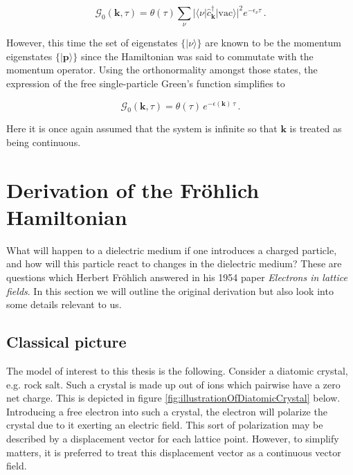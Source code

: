 \documentclass[12pt]{report}
\renewcommand{\vec}[1]{\boldsymbol{\mathbf{#1}}}                        %
\newcommand{\Gt}{\mathcal{G}}
\begin{document}
\begin{equation}
	\Gt_0(\vec k, \tau) = \theta(\tau)
	\sum_\nu | \langle \nu | \hat c^\dagger_{\vec k} | \text{vac} \rangle |^2 e^{-\epsilon_\nu \tau} \,.
\end{equation}

However, this time the set of eigenstates $ \{ | \nu \rangle \}  $ are known to be the momentum eigenstates $ \{ | \vec p \rangle \} $ since the Hamiltonian was said to commutate with the momentum operator. Using the orthonormality amongst those states, the expression of the free single-particle Green's function simplifies to

\begin{equation}
	\Gt_0(\vec k, \tau) = \theta(\tau) \, e^{-\epsilon(\vec k)  \, \tau} \,.
\end{equation}

Here it is once again assumed that the system is infinite so that $ \vec k $ is treated as being continuous.

\section{Derivation of the Fröhlich Hamiltonian}


What will happen to a dielectric medium if one introduces a charged particle, and how will this particle react to changes in the dielectric medium? These are questions which Herbert Fröhlich answered in his 1954 paper \textit{Electrons in lattice fields}\cite{electronsInLatticeFields}. In this section we will outline the original derivation but also look into some details relevant to us.

\subsection{Classical picture}

The model of interest to this thesis is the following. Consider a diatomic crystal, e.g. rock salt. Such a crystal is made up out of ions which pairwise have a zero net charge. This is depicted in figure \ref{fig:illustrationOfDiatomicCrystal} below. Introducing a free electron into such a crystal, the electron will polarize the crystal due to it exerting an electric field. This sort of polarization may be described by a displacement vector for each lattice point. However, to simplify matters, it is preferred to treat this displacement vector as a continuous vector field.
\end{document}
